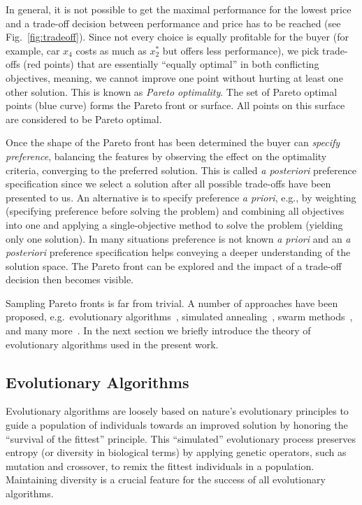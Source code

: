 \documentclass[%
reprint,
amsmath,amssymb,
aps,
prstab,
]{revtex4-1}
\begin{document}
In general, it is not possible to get the maximal performance for the lowest
  price and a trade-off decision between performance and price has to be
  reached (see Fig.~\ref{fig:tradeoff}).
Since not every choice is equally profitable for the buyer (for example, car
  $x_4$ costs as much as $x_2^*$ but offers less performance), we pick
  trade-offs (red points) that are essentially ``equally optimal'' in both
  conflicting objectives, meaning, we cannot improve one point without hurting
  at least one other solution.
This is known as \textit{Pareto optimality}.
The set of Pareto optimal points (blue curve) forms the Pareto front or
  surface.
All points on this surface are considered to be Pareto optimal.

Once the shape of the Pareto front has been determined the buyer can
  \textit{specify preference}, balancing the features by observing the
  effect on the optimality criteria, converging to the preferred solution.
This is called \textit{a posteriori} preference specification since we select
  a solution after all possible trade-offs have been presented to us.
An alternative is to specify preference \textit{a priori}, e.g., by
  weighting (specifying preference before solving the problem) and combining
  all objectives into one and applying a single-objective method to solve the
  problem (yielding only one solution).
In many situations preference is not known \textit{a priori} and an
  \textit{a posteriori} preference specification helps conveying a deeper
  understanding of the solution space.
The Pareto front can be explored and the impact of a trade-off decision then
  becomes visible.

Sampling Pareto fronts is far from trivial.
A number of approaches have been proposed,
  e.g.\ evolutionary algorithms~\cite{deb:09},
  simulated annealing~\cite{kigv:83},
  swarm methods~\cite{keeb:95},
  and many more~\cite{domc:96,cati:02,kara:05,hoss:09}.
In the next section we briefly introduce the theory of evolutionary algorithms
  used in the present work.


\subsection{Evolutionary Algorithms}

Evolutionary algorithms are loosely based on nature's evolutionary
  principles to guide a population of individuals towards an improved solution
  by honoring the ``survival of the fittest'' principle.
This ``simulated'' evolutionary process preserves entropy (or diversity in
  biological terms) by applying genetic operators, such as mutation and
  crossover, to remix the fittest individuals in a population.
Maintaining diversity is a crucial feature for the success of all evolutionary
  algorithms.
\end{document}
